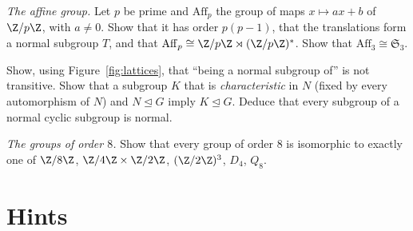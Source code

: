 \begin{exercise}[$\star\star$]\label{ex:affine}
\emph{The affine group.} Let $p$ be prime and $\mathrm{Aff}_p$ the group of maps $x\mapsto ax+b$ of $\Z/p\Z$, with $a\ne0$. Show that it has order $p(p-1)$, that the translations form a normal subgroup $T$, and that $\mathrm{Aff}_p\cong\Z/p\Z\rtimes(\Z/p\Z)^*$. Show that $\mathrm{Aff}_3\cong\mathfrak S_3$.
\end{exercise}

\begin{exercise}[$\star\star$]\label{ex:normalnormal}
Show, using Figure~\ref{fig:lattices}, that ``being a normal subgroup of'' is not transitive. Show that a subgroup $K$ that is \emph{characteristic} in $N$ (fixed by every automorphism of $N$) and $N\trianglelefteq G$ imply $K\trianglelefteq G$. Deduce that every subgroup of a normal cyclic subgroup is normal.
\end{exercise}

\begin{exercise}[$\star\star\star$]\label{ex:order8}
\emph{The groups of order $8$.} Show that every group of order $8$ is isomorphic to exactly one of $\Z/8\Z$, $\Z/4\Z\times\Z/2\Z$, $(\Z/2\Z)^3$, $D_4$, $Q_8$.
\end{exercise}

\section{Hints}

